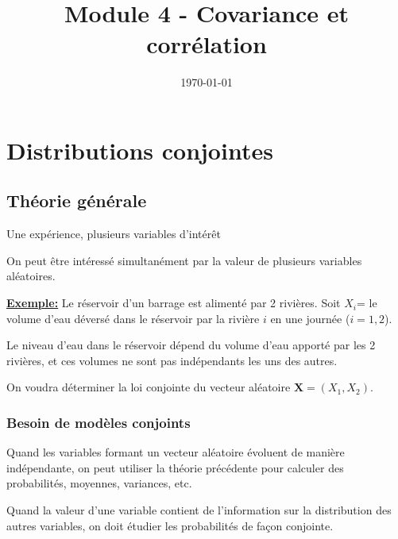 \documentclass{BeamerTemplate}
\title{Module 4 - Covariance et corrélation}
\date{\today}
\begin{document}
\begin{frame}[t]
  \titlepage
\end{frame}









\section{Distributions conjointes}

\subsection{Théorie générale}

\begin{frame}[t]{Une expérience, plusieurs variables d'intérêt}

{\small
On peut être intéressé \alert{simultanément} par la valeur de plusieurs variables aléatoires.

\medskip
\underline{\bf Exemple:} Le réservoir d'un barrage est alimenté par 2 rivières. Soit
$X_i$= le volume d'eau déversé dans le réservoir par la rivière $i$ en une journée
($i=1,2$).
\medskip

Le niveau d'eau dans le réservoir dépend du volume d'eau apporté par les 2 rivières, et ces volumes ne sont \alert{pas indépendants} les uns des autres.
\medskip

On voudra déterminer la \alert{loi conjointe du vecteur aléatoire ${\boldsymbol{X}}=(X_1, X_2)$}.
}



\end{frame}

\begin{frame}[t]
 \frametitle{Besoin de modèles conjoints}
 Quand les variables formant un vecteur aléatoire évoluent de manière indépendante, on peut utiliser la théorie précédente pour calculer des probabilités, moyennes, variances, etc.

 \bigskip
 Quand la valeur d'une variable contient de l'information sur la distribution des autres variables, on doit \alert{étudier les probabilités
 de façon conjointe}.

 \vspace{2cm}


\end{frame}
\end{document}
